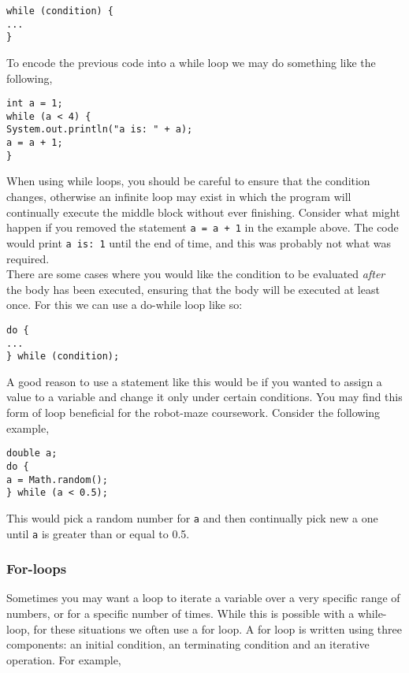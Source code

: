\begin{verbatim}
while (condition) {
...
}
\end{verbatim}

\noindent
To encode the previous code into a while loop we may do something like the following,

\begin{verbatim}
int a = 1;
while (a < 4) {
System.out.println("a is: " + a);
a = a + 1;
}
\end{verbatim}

\noindent
When using while loops, you should be careful to ensure that the condition changes, otherwise an infinite loop may exist in which the program will continually execute the middle block without ever finishing. Consider what might happen if you removed the statement {\tt a = a + 1} in the example above. The code would print {\tt a is: 1} until the end of time, and this was probably not what was required.\\

\noindent
There are some cases where you would like the condition to be evaluated \emph{after} the body has been executed, ensuring that the body will be executed at least once. For this we can use a do-while loop like so:

\begin{verbatim}
do {
...
} while (condition);
\end{verbatim}

\noindent
A good reason to use a statement like this would be if you wanted to assign a value to a variable and change it only under certain conditions. You may find this form of loop beneficial for the robot-maze coursework. Consider the following example,

\begin{verbatim}
double a;
do {
a = Math.random();
} while (a < 0.5);
\end{verbatim}

\noindent
This would pick a random number for {\tt a} and then continually pick new a one until {\tt a} is greater than or equal to 0.5.

\subsubsection*{For-loops}

Sometimes you may want a loop to iterate a variable over a very specific range of numbers, or for a specific number of times. While this is possible with a while-loop, for these situations we often use a for loop. A for loop is written using three components: an initial condition, an terminating condition and an iterative operation. For example,

